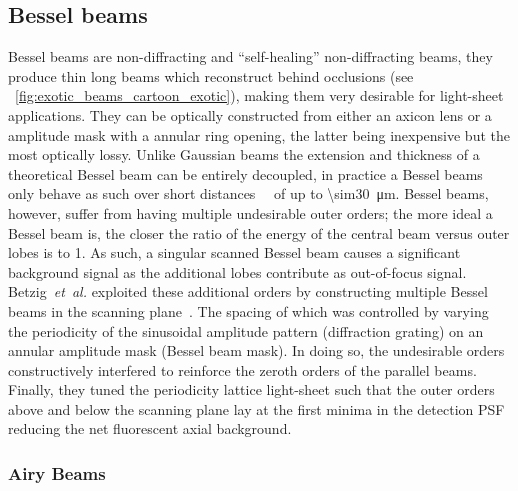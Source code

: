 \subsection{Bessel beams}

\gls{Bessel beam}s are non-diffracting and ``self-healing'' non-diffracting beams, they produce thin long beams which reconstruct behind occlusions (see \figurename~\ref{fig:exotic_beams_cartoon_exotic}), making them very desirable for light-sheet applications.
They can be optically constructed from either an \gls{axicon} lens or a amplitude mask with a annular ring opening, the latter being inexpensive but the most optically lossy.
Unlike Gaussian beams the extension and thickness of a theoretical \gls{Bessel beam} can be entirely decoupled, in practice a \gls{Bessel beam}s only behave as such over short distances~~\cite{gao_3d_2014} of up to \SI{\sim30}{\micro\meter}.
\gls{Bessel beam}s, however, suffer from having multiple undesirable outer orders; the more ideal a \gls{Bessel beam} is, the closer the ratio of the energy of the central beam versus outer lobes is to \SI{1}{}.
As such, a singular scanned \gls{Bessel beam} causes a significant background signal as the additional lobes contribute as out-of-focus signal.
Betzig~\emph{et~al.} exploited these additional orders by constructing multiple \gls{Bessel beam}s in the scanning plane~\cite{chen_lattice_2014}.
The spacing of which was controlled by varying the periodicity of the
sinusoidal amplitude pattern (diffraction grating) on an annular amplitude mask (\gls{Bessel beam} mask).
In doing so, the undesirable orders constructively interfered to reinforce the zeroth orders of the parallel beams.
Finally, they tuned the periodicity \gls{lattice light-sheet} such that the outer orders above and below the scanning plane lay at the first minima in the detection \gls{PSF} reducing the net fluorescent axial background.

\subsubsection{Airy Beams}

